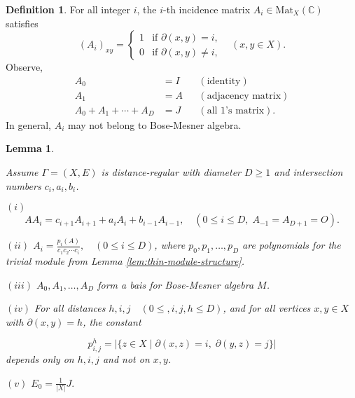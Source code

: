\documentclass[
]{book}
\newtheorem{lemma}{Lemma}[chapter]
\theoremstyle{definition}
\newtheorem{definition}{Definition}[chapter]
\theoremstyle{definition}
\theoremstyle{definition}
\theoremstyle{definition}
\theoremstyle{remark}
\begin{document}
\begin{definition}
\protect\hypertarget{def:ith-incidence}{}\label{def:ith-incidence}For all integer \(i\), the \(i\)-th incidence matrix \(A_i\in \mathrm{Mat}_X(\mathbb{C})\) satisfies
\[(A_i)_{xy} = \begin{cases} 1 & \text{if $\partial(x,y) = i$,}\\
0 & \text{if $\partial(x,y)\neq i$,}
\end{cases} \quad (x,y\in X).\]
Observe,
\begin{align}
A_0 & = I && (\text{identity})\\
A_1 & = A && (\text{adjacency matrix})\\
A_0 + A_1 + \cdots + A_D & = J && (\text{all 1's matrix}).
\end{align}
In general, \(A_i\) may not belong to Bose-Mesner algebra.
\end{definition}

\begin{lemma}
\protect\hypertarget{lem:incidence-matrices}{}\label{lem:incidence-matrices}

Assume \(\Gamma = (X, E)\) is distance-regular with diameter \(D\geq 1\) and intersection numbers \(c_i, a_i, b_i\).

\((i)\) \[AA_i = c_{i+1}A_{i+1} + a_iA_i + b_{i-1}A_{i-1}, \quad (0\leq i\leq D, \; A_{-1} = A_{D+1} = O).\]

\((ii)\) \({\displaystyle A_i = \frac{p_i(A)}{c_1c_2\cdots c_i}, \quad (0\leq i\leq D)}\), where \(p_0, p_1, \ldots, p_D\) are polynomials for the trivial module from Lemma \ref{lem:thin-module-structure}.

\((iii)\) \(A_0, A_1, \ldots, A_D\) form a bais for Bose-Mesner algebra \(M\).

\((iv)\) For all distances \(h, i, j \quad (0\leq, i, j, h\leq D)\), and for all vertices \(x, y\in X\) with \(\partial(x,y) = h\), the constant

\[p^h_{i,j} = |\{z\in X\mid \partial(x,z) = i, \; \partial(y,z) = j\}|\]
depends only on \(h, i, j\) and not on \(x, y\).

\((v)\) \({\displaystyle E_0 = \frac{1}{|X|}J.}\)

\end{lemma}
\end{document}
